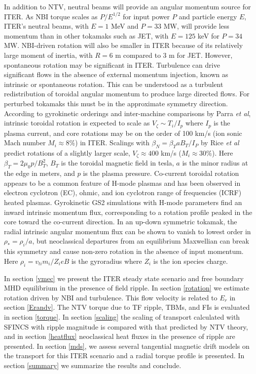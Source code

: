 \documentclass[aip, pop, preprint]{revtex4-1}
\begin{document}
In addition to NTV, neutral beams will provide an angular momentum source for ITER. As NBI torque scales as $P/E^{1/2}$ for input power $P$ and particle energy $E$, ITER's neutral beams, with $E = 1$ MeV and $P = 33$ MW, will provide less momentum than in other tokamaks such as JET, with $E = 125$ keV for $P = 34$ MW.\cite{Ciric2011} NBI-driven rotation will also be smaller in ITER because of its relatively large moment of inertia, with $R = 6$ m compared to 3 m for JET. However, spontaneous rotation may be significant in ITER. Turbulence can drive significant flows in the absence of external momentum injection, known as intrinsic or spontaneous rotation. This can be understood as a turbulent redistribution of toroidal angular momentum to produce large directed flows. For perturbed tokamaks this must be in the approximate symmetry direction. According to gyrokinetic orderings and inter-machine comparisons by Parra \textit{et al},\cite{Parra2012} intrinsic toroidal rotation is expected to scale as $V_{\zeta} \sim  T_i/I_p$ where $I_p$ is the plasma current, and core rotations may be on the order of 100 km/s (ion sonic Mach number $M_i \approx 8\%$) in ITER. Scalings with $\beta_N = \beta_T a B_T/I_P$ by Rice \textit{et al} \cite{Rice2007} predict rotations of a slightly larger scale, $V_{\zeta} \approx 400$ km/s ($M_i \approx 30\%$). Here $\beta_T =  2\mu_0 p/B_T^2$, $B_T$ is the toroidal magnetic field in tesla, $a$ is the minor radius at the edge in meters, and $p$ is the plasma pressure. Co-current toroidal rotation appears to be a common feature of H-mode plasmas and has been observed in electron cyclotron (EC),\cite{DeGrassie2007} ohmic,\cite{DeGrassie2007} and ion cyclotron range of frequencies (ICRF)\cite{Noterdaeme2003} heated plasmas. Gyrokinetic GS2 simulations with H-mode parameters find an inward intrinsic momentum flux, corresponding to a rotation profile peaked in the core toward the co-current direction.\cite{Lee2014} In an up-down symmetric tokamak, the radial intrinsic angular momentum flux can be shown to vanish to lowest order in $\rho_* = \rho_i/a$, but neoclassical departures from an equilibrium Maxwellian can break this symmetry and cause non-zero rotation in the absence of input momentum.\cite{Barnes2013} Here $\rho_i = v_{ti}m_i /{Z_ieB}$ is the gyroradius where $Z_i$ is the ion species charge.

In section \ref{vmec} we present the ITER steady state scenario and free boundary MHD equilibrium in the presence of field ripple. In section \ref{rotation} we estimate rotation driven by NBI and turbulence. This flow velocity is related to $E_r$ in section \ref{Erandv}. The NTV torque due to TF ripple, TBMs, and FIs is evaluated in section \ref{torque}. In section \ref{scaling} the scaling of transport calculated with SFINCS with ripple magnitude is compared with that predicted by NTV theory, and in section \ref{heatflux} neoclassical heat fluxes in the presence of ripple are presented. In section \ref{mds}, we assess several tangential magnetic drift models on the transport for this ITER scenario and a radial torque profile is presented. In section \ref{summary} we summarize the results and conclude.
\end{document}
